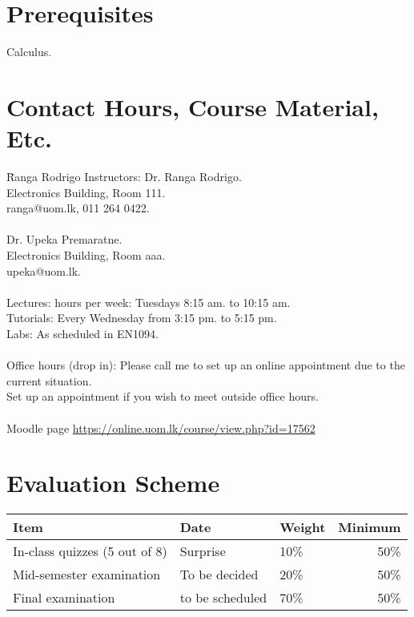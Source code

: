 \documentclass[11pt, a4paper]{article}
\begin{document}
\section{Prerequisites}
Calculus.


\section{Contact Hours, Course Material, Etc.}
\begin{tabbing}
  \hspace{2in}\= Ranga Rodrigo \kill
  Instructors: \>  Dr. Ranga Rodrigo.\\
  \> Electronics Building, Room 111.\\
                \> ranga@uom.lk, 011 264 0422.\\
                \\
                 \>  Dr. Upeka Premaratne.\\
  \> Electronics Building, Room aaa.\\
                \> upeka@uom.lk.\\
                \\
  Lectures:  hours per week: Tuesdays 8:15 am. to 10:15 am.\\
  Tutorials: \> Every Wednesday from 3:15 pm. to 5:15 pm.\\
  Labs: \> As scheduled in EN1094.\\
  \\
  Office hours (drop in): \> Please call me to set up an online appointment due to the current situation.\\
  \> Set up an appointment if you wish to meet outside office hours.\\
  \\
  Moodle page \>
  \href{https://online.uom.lk/course/view.php?id=17562}{https://online.uom.lk/course/view.php?id=17562}

\end{tabbing}

\section{Evaluation Scheme}
\begin{table}[h!]
\begin{tabular}{@{}lllr@{}}
  \toprule
  Item   & Date& Weight& Minimum\\
  \midrule
  In-class quizzes (5 out of 8) & Surprise & 10\% & 50\%\\

  Mid-semester examination  &  To be decided& 20\% & 50\%\\

  Final examination & to be scheduled & 70\% & 50\%\\
  \bottomrule
\end{tabular}
\end{table}
\end{document}
